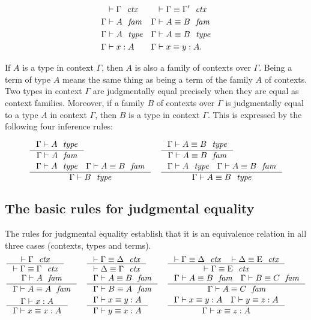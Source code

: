 \begin{align*}
\jctx*{\Gamma} & \jctxeq*{\Gamma}{\Gamma'}\\
\jfam*{\Gamma}{A} & \jfameq*{\Gamma}{A}{B}\\
\jtype*{\Gamma}{A} & \jtypeeq*{\Gamma}{A}{B}\\
\jterm*{\Gamma}{A}{x} & \jtermeq*{\Gamma}{A}{x}{y}.
\end{align*}

If $A$ is a type
in context $\Gamma$, then $A$ is also a family of contexts over $\Gamma$. Being
a term of type $A$ means the same thing as being a term of the family $A$ of contexts.
Two types in context $\Gamma$ are judgmentally equal precisely when they are equal
as context families. Moreover, if a family $B$ of contexts over $\Gamma$ is
judgmentally equal to a type $A$ in context $\Gamma$, then $B$ is a type in
context $\Gamma$. This is expressed by the following four inference rules:

\begin{align*}
& \inference
  {\jtype{\Gamma}{A}}
  {\jfam{\Gamma}{A}}
& & \inference
    {\jtypeeq{\Gamma}{A}{B}}
    {\jfameq{\Gamma}{A}{B}}\\
& \inference
  {\jtype{\Gamma}{A}
   \jfameq{\Gamma}{A}{B}}
  {\jtype{\Gamma}{B}}
& & \inference
    {\jtype{\Gamma}{A}
     \jfameq{\Gamma}{A}{B}}
    {\jtypeeq{\Gamma}{A}{B}}
\end{align*}


\subsection{The basic rules for judgmental equality}
The rules for judgmental equality establish that it is an equivalence relation
in all three cases (contexts, types and terms).
\bgroup\small
\begin{align*}
& \inference
  {\jctx{\Gamma}}
  {\jctxeq{\Gamma}{\Gamma}} 
& & \inference
    {\jctxeq{\Gamma}{\Delta}}
    {\jctxeq{\Delta}{\Gamma}} 
& & \inference
    {\jctxeq{\Gamma}{\Delta}
     \jctxeq{\Delta}{\greek{E}}}
    {\jctxeq{\Gamma}{\greek{E}}}\\
& \inference
  {\jfam{\Gamma}{A}}
  {\jfameq{\Gamma}{A}{A}} 
& & \inference
    {\jfameq{\Gamma}{A}{B}}
    {\jfameq{\Gamma}{B}{A}}
& & \inference
    {\jfameq{\Gamma}{A}{B}
     \jfameq{\Gamma}{B}{C}}
    {\jfameq{\Gamma}{A}{C}}\\
& \inference
  {\jterm{\Gamma}{A}{x}}
  {\jtermeq{\Gamma}{A}{x}{x}}
& & \inference
    {\jtermeq{\Gamma}{A}{x}{y}}
    {\jtermeq{\Gamma}{A}{y}{x}}
& & \inference
    {\jtermeq{\Gamma}{A}{x}{y}
     \jtermeq{\Gamma}{A}{y}{z}}
    {\jtermeq{\Gamma}{A}{x}{z}}
\end{align*}
\egroup

